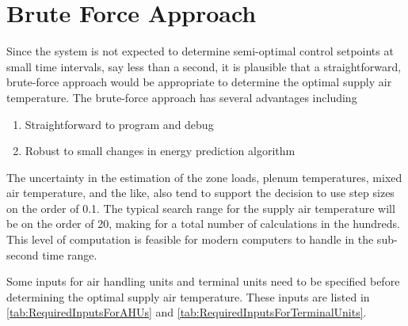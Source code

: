 
\section{Brute Force Approach}

Since the system is not expected to determine semi-optimal
control setpoints at small time intervals, say less than a second, it is
plausible that a straightforward, brute-force approach would be
appropriate to determine the optimal supply air temperature.  The
brute-force approach has several advantages including
\begin{enumerate}
        \item Straightforward to program and debug
        \item Robust to small changes in energy prediction algorithm
\end{enumerate}

The uncertainty in the estimation of the zone loads, plenum
temperatures, mixed air temperature, and the like, also tend to support
the decision to use step sizes on the order of  \SI{0.1}{\degreeF}. The
typical search range for the supply air temperature will be on the order
of \SI{20}{\degreeF}, making for a total number of calculations in the
hundreds.  This level of computation is feasible for modern
computers to handle in the sub-second time range.

Some inputs for air handling units and terminal units need to be
specified before determining the optimal supply air temperature. These
inputs are listed in \tableref{} \ref{tab:RequiredInputsForAHUs} and
\ref{tab:RequiredInputsForTerminalUnits}.

